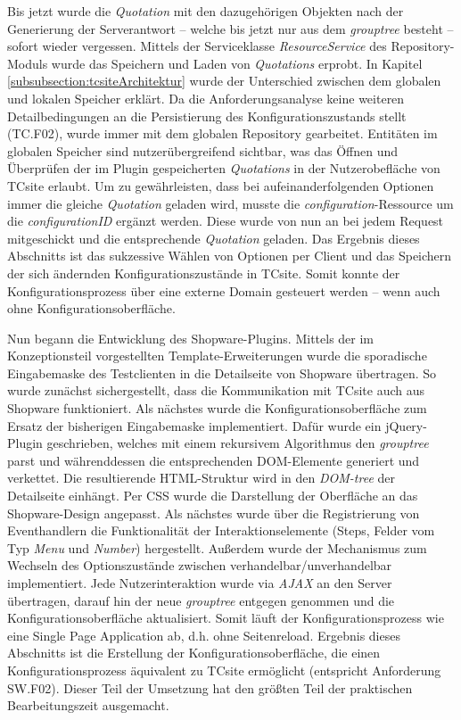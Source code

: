 \documentclass[12pt,a4paper,bibliography=totocnumbered,listof=totoc]{scrartcl}
\begin{document}
Bis jetzt wurde die \emph{Quotation} mit den dazugehörigen Objekten nach der Generierung der Serverantwort -- welche bis jetzt nur aus dem \emph{grouptree} besteht -- sofort wieder vergessen. Mittels der Serviceklasse \emph{ResourceService} des Repository-Moduls wurde das Speichern und Laden von \emph{Quotations} erprobt. In Kapitel \ref{subsubsection:tcsiteArchitektur} wurde der Unterschied zwischen dem globalen und lokalen Speicher erklärt. Da die Anforderungsanalyse keine weiteren Detailbedingungen an die Persistierung des Konfigurationszustands stellt (TC.F02), wurde immer mit dem globalen Repository gearbeitet. Entitäten im globalen Speicher sind nutzerübergreifend sichtbar, was das Öffnen und Überprüfen der im Plugin gespeicherten \emph{Quotations} in der Nutzerobefläche von TCsite erlaubt. Um zu gewährleisten, dass bei aufeinanderfolgenden Optionen immer die gleiche \emph{Quotation} geladen wird, musste die \emph{configuration}-Ressource um die \emph{configurationID} ergänzt werden. Diese wurde von nun an bei jedem Request mitgeschickt und die entsprechende \emph{Quotation} geladen. Das Ergebnis dieses Abschnitts ist das sukzessive Wählen von Optionen per Client und das Speichern der sich ändernden Konfigurationszustände in TCsite. Somit konnte der Konfigurationsprozess über eine externe Domain gesteuert werden -- wenn auch ohne Konfigurationsoberfläche.

Nun begann die Entwicklung des Shopware-Plugins. Mittels der im Konzeptionsteil vorgestellten Template-Erweiterungen wurde die sporadische Eingabemaske des Testclienten in die Detailseite von Shopware übertragen. So wurde zunächst sichergestellt, dass die Kommunikation mit TCsite auch aus Shopware funktioniert. Als nächstes wurde die Konfigurationsoberfläche zum Ersatz der bisherigen Eingabemaske implementiert. Dafür wurde ein jQuery-Plugin geschrieben, welches mit einem rekursivem Algorithmus den \emph{grouptree} parst und währenddessen die entsprechenden DOM-Elemente generiert und verkettet. Die resultierende HTML-Struktur wird in den \emph{DOM-tree} der Detailseite einhängt. Per CSS wurde die Darstellung der Oberfläche an das Shopware-Design angepasst. Als nächstes wurde über die Registrierung von Eventhandlern die Funktionalität der Interaktionselemente (Steps, Felder vom Typ \emph{Menu} und \emph{Number}) hergestellt. Außerdem wurde der Mechanismus zum Wechseln des Optionszustände zwischen verhandelbar/unverhandelbar implementiert. Jede Nutzerinteraktion wurde via \emph{AJAX} an den Server übertragen, darauf hin der neue \emph{grouptree} entgegen genommen und die Konfigurationsoberfläche aktualisiert. Somit läuft der Konfigurationsprozess wie eine Single Page Application ab, d.h. ohne Seitenreload. Ergebnis dieses Abschnitts ist die Erstellung der Konfigurationsoberfläche, die einen Konfigurationsprozess äquivalent zu TCsite ermöglicht (entspricht Anforderung SW.F02). Dieser Teil der Umsetzung hat den größten Teil der praktischen Bearbeitungszeit ausgemacht.
\end{document}

